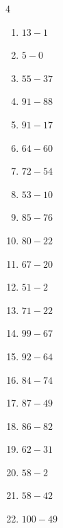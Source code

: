 \begin{multicols}{4}
\begin{enumerate}
  \item $13-1$
        \phantom{$=12$}

  \item $5-0$
        \phantom{$=5$}

  \item $55-37$
        \phantom{$=18$}

  \item $91-88$
        \phantom{$=3$}

  \item $91-17$
        \phantom{$=74$}

  \item $64-60$
        \phantom{$=4$}

  \item $72-54$
        \phantom{$=18$}

  \item $53-10$
        \phantom{$=43$}

  \item $85-76$
        \phantom{$=9$}

  \item $80-22$
        \phantom{$=58$}

  \item $67-20$
        \phantom{$=47$}

  \item $51-2$
        \phantom{$=49$}

  \item $71-22$
        \phantom{$=49$}

  \item $99-67$
        \phantom{$=32$}

  \item $92-64$
        \phantom{$=28$}

  \item $84-74$
        \phantom{$=10$}

\columnbreak %

  \item $87-49$
        \phantom{$=38$}

  \item $86-82$
        \phantom{$=4$}

  \item $62-31$
        \phantom{$=31$}

  \item $58-2$
        \phantom{$=56$}

  \item $58-42$
        \phantom{$=16$}

  \item $100-49$
        \phantom{$=51$}


\end{enumerate}
\end{multicols}

